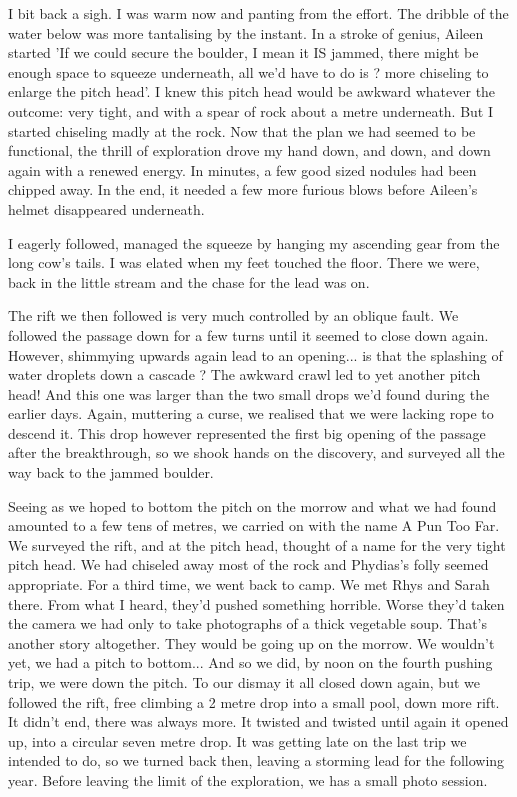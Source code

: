 \documentclass[onecolumn]{book}
\begin{document}
I bit back a sigh. I was warm now and panting from the effort. The dribble of the water below was more tantalising by the instant. In a stroke of genius, Aileen started 'If we could secure the boulder, I mean it IS jammed, there might be enough space to squeeze underneath, all we'd have to do is ? more chiseling to enlarge the pitch head'.
I knew this pitch head would be awkward whatever the outcome: very tight, and with a spear of rock about a metre underneath. But I started chiseling madly at the rock. Now that the plan we had seemed to be functional, the thrill of exploration drove my hand down, and down, and down again with a renewed energy. In minutes, a few good sized nodules had been chipped away. In the end, it needed a few more furious blows before Aileen's helmet disappeared underneath.

I eagerly followed, managed the squeeze by hanging my ascending gear from the long cow's tails. I was elated when my feet touched the floor. There we were, back in the little stream and the chase for the lead was on.

The rift we then followed is very much controlled by an oblique fault. We followed the passage down for a few turns until it seemed to close down again. However, shimmying upwards again lead to an opening... is that the splashing of water droplets down a cascade ? The awkward crawl led to yet another pitch head!
And this one was larger than the two small drops we'd found during the earlier days. Again, muttering a curse, we realised that we were lacking rope to descend it. This drop however represented the first big opening of the passage after the breakthrough, so we shook hands on the discovery, and surveyed all the way back to the jammed boulder.

Seeing as we hoped to bottom the pitch on the morrow and what we had found amounted to a few tens of metres, we carried on with the name A Pun Too Far. We surveyed the rift, and at the pitch head, thought of a name for the very tight pitch head. We had chiseled away most of the rock and Phydias's folly seemed appropriate.
For a third time, we went back to camp. We met Rhys and Sarah there. From what I heard, they'd pushed something horrible. Worse they'd taken the camera we had only to take photographs of a thick vegetable soup. That's another story altogether. They would be going up on the morrow. We wouldn't yet, we had a pitch to bottom...
And so we did, by noon on the fourth pushing trip, we were down the pitch. To our dismay it all closed down again, but we followed the rift, free climbing a 2 metre drop into a small pool, down more rift. It didn't end, there was always more. It twisted and twisted until again it opened up, into a circular seven metre drop. It was getting late on the last trip we intended to do, so we turned back then, leaving a storming lead for the following year. Before leaving the limit of the exploration, we has a small photo session.
\end{document}

